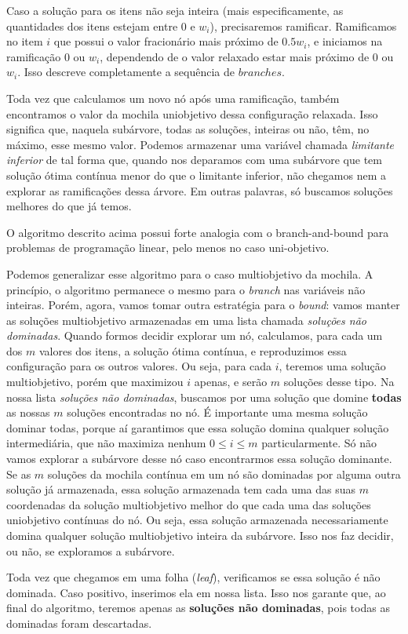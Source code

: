 Caso a solução para os itens não seja inteira (mais especificamente, as quantidades dos itens estejam entre $0$ e $w_i$), precisaremos ramificar. Ramificamos no item $i$ que possui o valor fracionário mais próximo de $0.5w_i$, e iniciamos na ramificação $0$ ou $w_i$, dependendo de o valor relaxado estar mais próximo de  $0$ ou $w_i$. Isso descreve completamente a sequência de $branches$.

Toda vez que calculamos um novo nó após uma ramificação, também encontramos o valor da mochila uniobjetivo dessa configuração relaxada. Isso significa que, naquela subárvore, todas as soluções, inteiras ou não, têm, no máximo, esse mesmo valor. Podemos armazenar uma variável chamada \textit{limitante inferior} de tal forma que, quando nos deparamos com uma subárvore que tem solução ótima contínua menor do que o limitante inferior, não chegamos nem a explorar as ramificações dessa árvore. Em outras palavras, só buscamos soluções melhores do que já temos.

O algoritmo descrito acima possui forte analogia com o branch-and-bound para problemas de programação linear, pelo menos no caso uni-objetivo.

Podemos generalizar esse algoritmo para o caso multiobjetivo da mochila. A princípio, o algoritmo permanece o mesmo para o \textit{branch} nas variáveis não inteiras. Porém, agora, vamos tomar outra estratégia para o \textit{bound}: vamos manter as soluções multiobjetivo armazenadas em uma lista chamada \textit{soluções não dominadas}. Quando formos decidir explorar um nó, calculamos, para cada um dos $m$ valores dos itens, a solução ótima contínua, e reproduzimos essa configuração para os outros valores. Ou seja, para cada $i$, teremos uma solução multiobjetivo, porém que maximizou $i$ apenas, e serão $m$ soluções desse tipo. Na nossa lista \textit{soluções não dominadas}, buscamos por uma solução que domine \textbf{todas} as nossas $m$ soluções encontradas no nó. É importante uma mesma solução dominar todas, porque aí garantimos que essa solução domina qualquer solução intermediária, que não maximiza nenhum $0 \le i \le m$ particularmente. Só não vamos explorar a subárvore desse nó caso encontrarmos essa solução dominante. Se as $m$ soluções da mochila contínua em um nó são dominadas por alguma outra solução já armazenada, essa solução armazenada tem cada uma das suas $m$ coordenadas da solução multiobjetivo melhor do que cada uma das soluções uniobjetivo contínuas do nó. Ou seja, essa solução armazenada necessariamente domina qualquer solução multiobjetivo inteira da subárvore. Isso nos faz decidir, ou não, se exploramos a subárvore.

Toda vez que chegamos em uma folha (\textit{leaf}), verificamos se essa solução é não dominada. Caso positivo, inserimos ela em nossa lista. Isso nos garante que, ao final do algoritmo, teremos apenas as \textbf{soluções não dominadas}, pois todas as dominadas foram descartadas.
